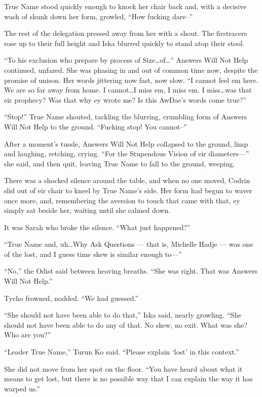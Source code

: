 True Name stood quickly enough to knock her chair back and, with a decisive wash of skunk down her form, growled, ``How fucking dare--''

The rest of the delegation pressed away from her with a shout. The firstracers rose up to their full height and Iska blurred quickly to stand atop their stool.

``To his exclusion who prepare by process of Size\ldots of\ldots{}'' Answers Will Not Help continued, unfazed. She was phasing in and out of common time now, despite the promise of unison. Her words jittering now fast, now slow. ``I cannot feel em here. We are so far away from home. I cannot\ldots I miss em, I miss em. I miss\ldots was that eir prophecy? Was that why ey wrote me? Is this AwDae's words come true?''

``Stop!'' True Name shouted, tackling the blurring, crumbling form of Answers Will Not Help to the ground. ``Fucking stop! You cannot--''

After a moment's tussle, Answers Will Not Help collapsed to the ground, limp and laughing, retching, crying. ``For the Stupendous Vision of eir diameters—'' she said, and then quit, leaving True Name to fall to the ground, weeping.

There was a shocked silence around the table, and when no one moved, Codrin slid out of eir chair to kneel by True Name's side. Her form had begun to waver once more, and, remembering the aversion to touch that came with that, ey simply sat beside her, waiting until she calmed down.

It was Sarah who broke the silence. ``What just happened?''

``True Name and, uh\ldots Why Ask Questions — that is, Michelle Hadje — was one of the lost, and I guess time skew is similar enough to—''

``No,'' the Odist said between heaving breaths. ``She was right. That was Answers Will Not Help.''

Tycho frowned, nodded. ``We had guessed.''

``She should not have been able to do that,'' Iska said, nearly growling. ``She should not have been able to do any of that. No skew, no exit. What was she? Who are you?''

``Leader True Name,'' Turun Ko said. ``Please explain `lost' in this context.''

She did not move from her spot on the floor. ``You have heard about what it means to get lost, but there is no possible way that I can explain the way it has warped us.''

